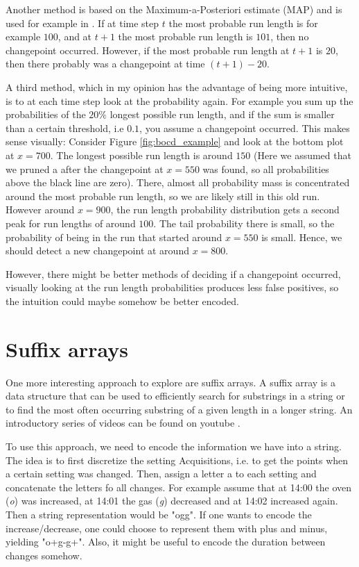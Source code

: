 \documentclass[12pt,a4paper]{article}
\begin{document}
Another method is based on the Maximum-a-Posteriori estimate (MAP)  and is used for example in \cite{Knoblauch:SpatiotemporalBayesian}. If at time step $t$ the most probable run length is for example $100$, and at $t+1$ the most probable run length is $101$, then no changepoint occurred. However, if the most probable run length at $t+1$ is $20$, then there probably was a changepoint at time $(t+1)-20$.

A third method, which in my opinion has the advantage of being more intuitive, is to at each time step look at the probability again. For example you sum up the probabilities of the $20\%$ longest possible run length, and if the sum is smaller than a certain threshold, i.e $0.1$, you assume a changepoint occurred. This makes sense visually: Consider Figure \ref{fig:bocd_example} and look at the bottom plot at $x=700$. The longest possible run length is around $150$ (Here we assumed that we pruned a after the changepoint at $x=550$ was found, so all probabilities above the black line are zero). There, almost all probability mass is concentrated around the most probable run length, so we are likely still in this old run. However around $x=900$, the run length probability distribution gets a second peak for run lengths of around $100$. The tail probability there is small, so the probability of being in the run that started around $x=550$ is small. Hence, we should detect a new changepoint at around $x=800$.

However, there might be better methods of deciding if a changepoint occurred, visually looking at the run length probabilities produces less false positives, so the intuition could maybe somehow be better encoded. 


\hypertarget{suffix-arrays}{%
\section{Suffix arrays}\label{suffix-arrays}}

One more interesting approach to explore are suffix arrays. A suffix array is a data structure that can be used to efficiently search for substrings in a string or to find the most often occurring substring of a given length in a longer string. An introductory series of videos can be found on youtube \cite{WilliamFiset:SuffixArrayPlaylist}.

To use this approach, we need to encode the information we have into a string. The idea is to first discretize the setting Acquisitions, i.e. to get the points when a certain setting was changed. Then, assign a letter a to each setting and concatenate the letters fo all changes. For example assume that at 14:00 the oven (\textit{o}) was increased, at 14:01 the gas (\textit{g}) decreased and at 14:02 increased again. Then a string representation would be "ogg". If one wants to encode the increase/decrease, one could choose to represent them with plus and minus, yielding "o+g-g+". Also, it might be useful to encode the duration between changes somehow.
\end{document}

